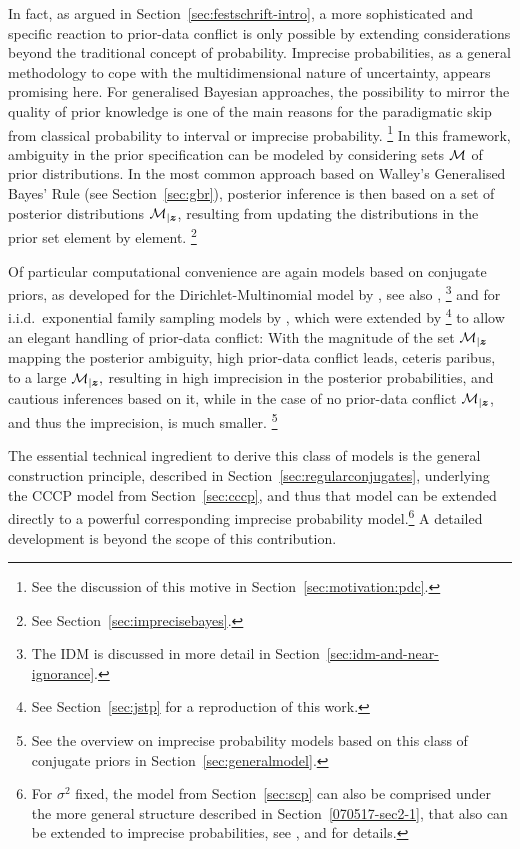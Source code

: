 In fact, as argued in Section~\ref{sec:festschrift-intro}, a more sophisticated and specific reaction to prior-data conflict
is only possible by extending considerations beyond the traditional concept of probability.
Imprecise probabilities, as a general methodology to cope with the multidimensional nature of uncertainty, appears promising here.
For generalised Bayesian approaches, the possibility to mirror the quality of prior knowledge
is one of the main reasons for the paradigmatic skip from classical probability to interval or imprecise probability.%
\footnote{See the discussion of this motive in Section~\ref{sec:motivation:pdc}.}
In this framework, ambiguity in the prior specification
can be modeled by considering sets ${\cal M}$ of prior distributions.
In the most common approach based on Walley's \parencite*{1991:walley} Generalised Bayes' Rule (see Section~\ref{sec:gbr}),
posterior inference is then based on a set of posterior distributions ${\cal M}_{\vert {\bm z}}$,
resulting from updating the distributions in the prior set element by element.%
\footnote{See Section~\ref{sec:imprecisebayes}.}

Of particular computational convenience are again models based on conjugate priors, as developed
for the Dirichlet-Multinomial model by \textcite{1996:walley::idm}, see also \textcite{2009:bernard},%
\footnote{The IDM is discussed in more detail in Section~\ref{sec:idm-and-near-ignorance}.}
and for i.i.d.\ exponential family sampling models by \textcite{2005:quaeghebeurcooman},
which were extended by \textcite{Walter2009a}%
\footnote{See Section~\ref{sec:jstp} for a reproduction of this work.}
to allow an elegant handling of prior-data conflict:
With the magnitude of the set ${\cal M}_{\vert {\bm z}}$ mapping the posterior ambiguity,
high prior-data conflict leads, ceteris paribus, to a large
${\cal M}_{\vert {\bm z}},$ resulting in high imprecision in the
posterior probabilities, and cautious inferences based on it, while in the case of no prior-data conflict
${\cal M}_{\vert {\bm z}}$, and thus the imprecision, is much smaller.%
\footnote{See the overview on imprecise probability models based on this class of conjugate priors in Section~\ref{sec:generalmodel}.}

The essential technical ingredient to derive this class of models is the general construction principle,
described in Section~\ref{sec:regularconjugates},
underlying the CCCP model from Section~\ref{sec:cccp}, and thus that model can be extended directly to
a powerful corresponding imprecise probability model.\footnote{For $\sigma^2$ fixed, the model from
Section~\ref{sec:scp} can also be comprised under the more general structure described in Section~\ref{070517-sec2-1},
that also can be extended to imprecise probabilities, see \textcite{Walter2007a}, and \textcite{Walter2006a} for details.}
A detailed development is beyond the scope of this contribution. %

